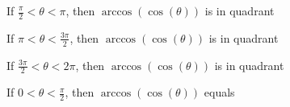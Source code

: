 \documentclass{ximera}
\begin{document}
\begin{question}


If $\frac{\pi}{2} < \theta < \pi$, then $\arccos(\cos(\theta))$ is in quadrant

\begin{multipleChoice}
\end{multipleChoice}

\end{question}









\begin{question}


If $\pi < \theta < \frac{3\pi}{2}$, then $\arccos(\cos(\theta))$ is in quadrant

\begin{multipleChoice}
\end{multipleChoice}

\end{question}







\begin{question}


If $\frac{3\pi}{2} < \theta < 2\pi$, then $\arccos(\cos(\theta))$ is in quadrant

\begin{multipleChoice}
\end{multipleChoice}

\end{question}


















\begin{question}


If $0 < \theta < \frac{\pi}{2}$, then $\arccos(\cos(\theta))$ equals

\begin{multipleChoice}
\choice[correct] {$\theta$}
\choice {$\pi - \theta$}
\choice {$\pi + \theta$}
\choice {$2\pi - \theta$}
\end{multipleChoice}

\end{question}
\end{document}
